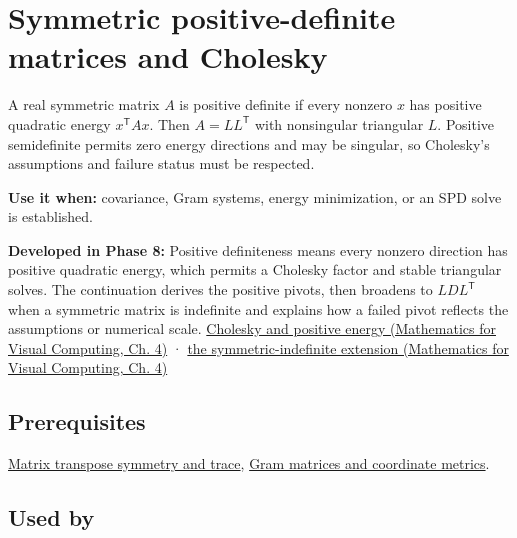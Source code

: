 \hypertarget{appendix-50d2ea3c9b26}{}\label{referencestart:appendix-50d2ea3c9b26}
\section{Symmetric positive-definite matrices and Cholesky}\label{appendix-50d2ea3c9b26-symmetric-positive-definite-matrices-and-cholesky}

\hypertarget{appendix-50d2ea3c9b26-symmetric-positive-definite-matrices-and-cholesky}{}

A real symmetric matrix \(A\) is positive definite if every nonzero \(x\) has positive quadratic energy \(x^\mathsf T A x\). Then \(A=LL^\mathsf T\) with nonsingular triangular \(L\). Positive semidefinite permits zero energy directions and may be singular, so Cholesky's assumptions and failure status must be respected.

\textbf{Use it when:} covariance, Gram systems, energy minimization, or an SPD solve is established.

\textbf{Developed in Phase 8:} Positive definiteness means every nonzero direction has positive quadratic energy, which permits a Cholesky factor and stable triangular solves. The continuation derives the positive pivots, then broadens to \(LDL^\mathsf T\) when a symmetric matrix is indefinite and explains how a failed pivot reflects the assumptions or numerical scale. \href{../02-Mathematics-for-Visual-Computing/main.pdf\#nameddest=01-foundations-i-ch020-positive-definiteness-is-a-structural-promise}{Cholesky and positive energy (Mathematics for Visual Computing, Ch. 4)} · \href{../02-Mathematics-for-Visual-Computing/main.pdf\#nameddest=01-foundations-i-ch020-ldlt-reaches-symmetric-indefinite-matrices}{the symmetric-indefinite extension (Mathematics for Visual Computing, Ch. 4)}

\subsection{Prerequisites}\label{appendix-50d2ea3c9b26-prerequisites}

\hypertarget{appendix-50d2ea3c9b26-prerequisites}{}

\hyperref[appendix-175ca5ff874d]{Matrix transpose symmetry and trace}, \hyperref[appendix-3b863809f82a]{Gram matrices and coordinate metrics}.

\subsection{Used by}\label{appendix-50d2ea3c9b26-used-by}

